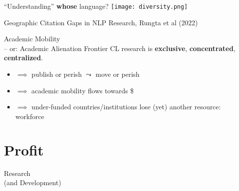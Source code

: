 \documentclass[aspectratio=169]{beamer}
\begin{document}
\begin{frame}{``Understanding'' \textbf{whose} language?
}
	\smaller
	\centering
	\vspace{0.5em}
	\texttt{[image: diversity.png]}
	\begin{flushright}
		\smaller[2]
		\vspace{-1.5em}
		\textcolor{gray!90}{Geographic Citation Gaps in NLP Research, Rungta et al (2022)}
	\end{flushright}
\end{frame}

\begin{frame}{Academic Mobility \\ 
\quad \smaller -- or: Academic Alienation}
	\smaller
	Frontier CL research is \textbf{exclusive}, \textbf{concentrated}, \textbf{centralized}.
	\begin{itemize}
		\item[] $\implies$ publish or perish $\leadsto$ \alert{move} or perish
		\item[] $\implies$ academic mobility \alert{flows towards \$}
		\item[] $\implies$ under-funded countries/institutions lose (yet) another resource: \alert{workforce}
	\end{itemize}
	\vfill
	
	\centering
\end{frame}

\section{Profit}

\begin{frame}{Research\\
\quad \smaller (and Development)}
	\centering
\end{frame}
\end{document}
